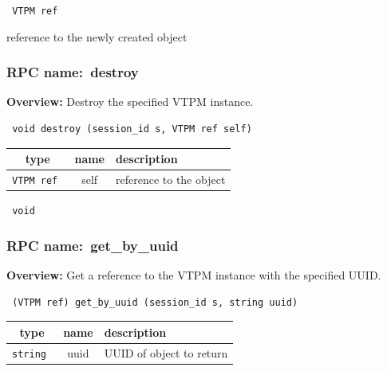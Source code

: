 {\tt 
VTPM ref
}


reference to the newly created object
\vspace{0.3cm}
\vspace{0.3cm}
\vspace{0.3cm}
\subsubsection{RPC name:~destroy}

{\bf Overview:} 
Destroy the specified VTPM instance.

\begin{verbatim} void destroy (session_id s, VTPM ref self)\end{verbatim}



 
\vspace{0.3cm}
\begin{tabular}{|c|c|p{7cm}|}
 \hline
{\bf type} & {\bf name} & {\bf description} \\ \hline
{\tt VTPM ref } & self & reference to the object \\ \hline 

\end{tabular}

\vspace{0.3cm}

{\tt 
void
}



\vspace{0.3cm}
\vspace{0.3cm}
\vspace{0.3cm}
\subsubsection{RPC name:~get\_by\_uuid}

{\bf Overview:} 
Get a reference to the VTPM instance with the specified UUID.

\begin{verbatim} (VTPM ref) get_by_uuid (session_id s, string uuid)\end{verbatim}



 
\vspace{0.3cm}
\begin{tabular}{|c|c|p{7cm}|}
 \hline
{\bf type} & {\bf name} & {\bf description} \\ \hline
{\tt string } & uuid & UUID of object to return \\ \hline 

\end{tabular}

